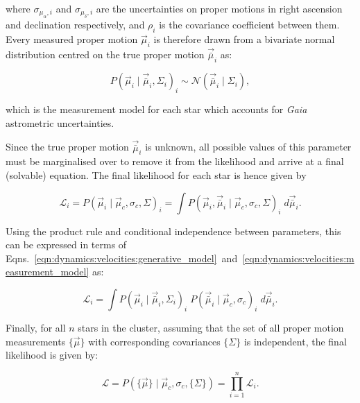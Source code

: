 \noindent
where $\sigma_{\mu_\alpha, i}$ and $\sigma_{\mu_\delta, i}$ are the uncertainties on proper motions in right ascension and declination respectively, and $\rho_i$ is the covariance coefficient between them. Every measured proper motion $\vec{\mu}_i$ is therefore drawn from a bivariate normal distribution centred on the true proper motion $\vec{\bar{\mu}}_i$ as:

\begin{equation}\label{eqn:dynamics:velocities:measurement_model}
    P(\vec{\mu}_i \mid
    \vec{\bar{\mu}}_i, \Sigma_i)_i \sim \mathcal{N}(\vec{\bar{\mu}}_i \mid \Sigma_i),
\end{equation}

\noindent
which is the measurement model for each star which accounts for \emph{Gaia} astrometric uncertainties.

Since the true proper motion $\vec{\bar{\mu}}_i$ is unknown, all possible values of this parameter must be marginalised over to remove it from the likelihood and arrive at a final (solvable) equation. The final likelihood for each star is hence given by

\begin{equation}
    \mathcal{L}_i = P(\vec{\mu}_i \mid \vec{\mu}_c, \sigma_c, \Sigma)_i = 
    \int P(\vec{\mu}_i, \vec{\bar{\mu}}_i \mid \vec{\mu}_c, \sigma_c, \Sigma)_i \; d \vec{\bar{\mu}}_i.
\end{equation}

\noindent
Using the product rule and conditional independence between parameters, this can be expressed in terms of Eqns.~\ref{eqn:dynamics:velocities:generative_model}~and~\ref{eqn:dynamics:velocities:measurement_model} as:

\begin{equation}
    \mathcal{L}_i%
    = \int P(\vec{\mu}_i \mid \vec{\bar{\mu}}_i, \Sigma_i)_i \;
    P(\vec{\bar{\mu}}_i \mid \vec{\mu}_c, \sigma_c)_i \;
    d \vec{\bar{\mu}}_i.
\end{equation}

Finally, for all $n$ stars in the cluster, assuming that the set of all proper motion measurements $\{\vec{\mu}\}$ with corresponding covariances $\{\Sigma\}$ is independent, the final likelihood is given by:

\begin{equation}
    \mathcal{L} 
    = P(\{\vec{\mu}\}\mid\vec{\mu}_c,\sigma_c,\{\Sigma\}) 
    = \prod_{i=1}^{n} \mathcal{L}_i.
\end{equation}


